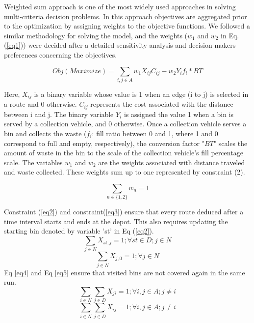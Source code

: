 \documentclass[12pt]{article}
\begin{document}
Weighted sum approach is one of the most widely used approaches in solving multi-criteria decision problems. In this approach objectives are aggregated prior to the optimization by assigning weights to the objective functions. We followed a similar methodology for solving the model, and the weights ($w_1$ and $w_2$ in Eq. (\ref{eq1})) were decided after a detailed sensitivity analysis and decision makers preferences concerning the objectives.

\begin{equation}\label{eq1}
    Obj(Maximize)=\sum_{i,j \in A} w_1 X_{ij} C_{ij} - w_2 Y_i f_i * BT
\end{equation}

Here, $X_{ij}$ is a binary variable whose value is 1 when an edge (i to j) is selected in a route and 0 otherwise. $C_{ij}$ represents the cost associated with the distance between i and j. The binary variable $Y_{i}$ is assigned the value 1 when a bin is served by a collection vehicle, and 0 otherwise. Once a collection vehicle serves a bin and collects the waste ($f_i$: fill ratio between 0 and 1, where 1 and 0 correspond to full and empty, respectively), the conversion factor "$BT$" scales the amount of waste in the bin to the scale of the collection vehicle's fill percentage scale. The variables $w_1$ and $w_2$ are the weights associated with distance traveled and waste collected. These weights sum up to one represented by constraint (2).

\begin{equation}\label{eq1.5}
    \sum_{n\in \{1,2\}} w_n = 1
\end{equation}


Constraint (\ref{eq2}) and constraint(\ref{eq3}) ensure that every route deduced after a time interval starts and ends at the depot. This also requires updating the starting bin denoted by variable 'st' in Eq (\ref{eq2}).
\begin{equation}\label{eq2}
    \sum_{j\in N}X_{st,j}=1 ; \forall st \in D ; j \in N
\end{equation}
\begin{equation}\label{eq3}
    \sum_{j\in N}X_{j,0}=1 ; \forall j \in N
\end{equation}
Eq \eqref{eq4} and Eq \eqref{eq5} ensure that visited bins are not covered again in the same run.
\begin{equation}\label{eq4}
    \sum_{i\in N}\sum_{j\in D } X_{ji}=1 ; \forall i,j \in A ; j\ne i
\end{equation}
\begin{equation}\label{eq5}
    \sum_{i\in N}\sum_{j\in D } X_{ij}=1 ; \forall i,j \in A ; j\ne i
\end{equation}
\end{document}
